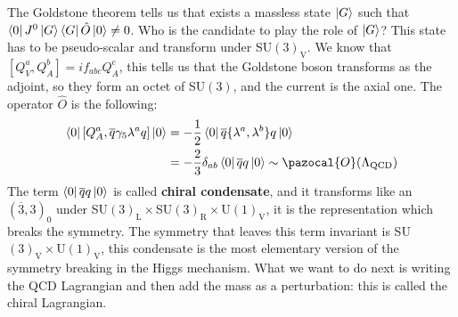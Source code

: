 \documentclass[../main.tex]{subfiles}
\begin{document}
The Goldstone theorem tells us that exists a massless state $\ket{G}$ such that $\bra{0}J^0\ket{G}\bra{G}\hat{O}\ket{0}\neq0$. Who is the candidate to play the role of $\ket{G}$? This state has to be pseudo-scalar and transform under SU$(3)_{\text{V}}$. We know that $[Q_V^a,Q_A^b]=if_{abc}Q_A^c$, this tells us that the Goldstone boson transforms as the adjoint, so they form an octet of SU$(3)$, and the current is the axial one. The operator $\hat{O}$ is the following:
\begin{align*}
\bra{0}[Q_A^a,\overline{q}\gamma_5\lambda^aq]\ket{0}&=-\frac{1}{2}\bra{0}\overline{q}\{\lambda^a,\lambda^b\}q\ket{0}\\
&=-\frac{2}{3}\delta_{ab}\bra{0}\overline{q}q\ket{0}\sim\pazocal{O}(\Lambda_{\text{QCD}})
\end{align*}
The term $\bra{0}\overline{q}q\ket{0}$ is called \textbf{chiral condensate}, and it transforms like an $(\overline{3},3)_0$ under SU$(3)_{\text{L}}\times$SU$(3)_{\text{R}}\times$U$(1)_{\text{V}}$, it is the representation which breaks the symmetry. The symmetry that leaves this term invariant is SU$(3)_{\text{V}}\times$U$(1)_{\text{V}}$, this condensate is the most elementary version of the symmetry breaking in the Higgs mechanism. What we want to do next is writing the QCD Lagrangian and then add the mass as a perturbation: this is called the chiral Lagrangian.
\end{document}
